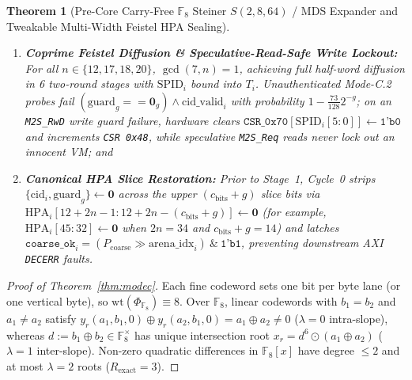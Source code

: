 \documentclass[11pt,letterpaper]{article}
\theoremstyle{spectralthm}
\newtheorem{theorem}{Theorem}[section]
\begin{document}
\begin{theorem}[Pre-Core Carry-Free $\mathbb{F}_8$ Steiner $S(2,8,64)$ / MDS Expander and Tweakable Multi-Width Feistel HPA Sealing]
\begin{enumerate}
  \item[(ii)] \textbf{Coprime Feistel Diffusion \& Speculative-Read-Safe Write Lockout:} For all $n \in \{12, 17, 18, 20\}$, $\gcd(7,n) = 1$, achieving full half-word diffusion in 6 two-round stages with $\mathrm{SPID}_i$ bound into $T_i$. Unauthenticated Mode-C.2 probes fail $(\mathrm{guard}_g == \mathbf{0}_g) \wedge \mathrm{cid\_valid}_i$ with probability $1 - \frac{73}{128} 2^{-g}$; on an \texttt{M2S\_RwD} write guard failure, hardware clears $\texttt{CSR\_0x70}[\mathrm{SPID}_i[5:0]] \leftarrow \texttt{1'b0}$ and increments \texttt{CSR 0x48}, while speculative \texttt{M2S\_Req} reads never lock out an innocent VM; and
  \item[(iii)] \textbf{Canonical HPA Slice Restoration:} Prior to Stage~1, Cycle~0 strips $\{\mathrm{cid}_i, \mathrm{guard}_g\} \leftarrow \mathbf{0}$ across the upper $(c_{\mathrm{bits}}+g)$ slice bits via $\mathrm{HPA}_i[12+2n-1 : 12+2n-(c_{\mathrm{bits}}+g)] \leftarrow \mathbf{0}$ (for example, $\mathrm{HPA}_i[45:32] \leftarrow \mathbf{0}$ when $2n=34$ and $c_{\mathrm{bits}}+g=14$) and latches $\texttt{coarse\_ok}_i = (P_{\mathrm{coarse}} \gg \mathrm{arena\_idx}_i) \ \&\ \texttt{1'b1}$, preventing downstream AXI \texttt{DECERR} faults.
\end{enumerate}
\end{theorem}
\begin{proof}[Proof of Theorem~\ref{thm:modec}]
Each fine codeword sets one bit per byte lane (or one vertical byte), so $\mathrm{wt}(\Phi_{\mathbb{F}_8}) \equiv 8$. Over $\mathbb{F}_8$, linear codewords with $b_1 = b_2$ and $a_1 \neq a_2$ satisfy $y_r(a_1,b_1,0) \oplus y_r(a_2,b_1,0) = a_1 \oplus a_2 \neq 0$ ($\lambda = 0$ intra-slope), whereas $d := b_1 \oplus b_2 \in \mathbb{F}_8^\times$ has unique intersection root $x_r = d^6 \odot (a_1 \oplus a_2)$ ($\lambda = 1$ inter-slope). Non-zero quadratic differences in $\mathbb{F}_8[x]$ have degree $\le 2$ and at most $\lambda = 2$ roots ($R_{\mathrm{exact}} = 3$).
\end{proof}
\end{document}
